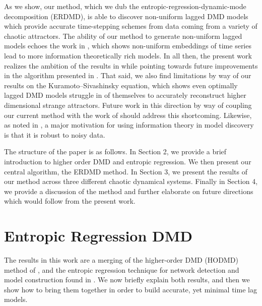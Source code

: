 \documentclass[a4paper,11pt]{article}
\begin{document}
As we show, our method, which we dub the entropic-regression-dynamic-mode decomposition (ERDMD), is able to discover non-uniform lagged DMD models which provide accurate time-stepping schemes from data coming from a variety of chaotic attractors.  The ability of our method to generate non-uniform lagged models echoes the work in \cite{vlachos, faes}, which shows non-uniform embeddings of time series lead to more information theoretically rich models.  In all then, the present work realizes the ambition of the results in \cite{arbabi} while pointing towards future improvements in the algorithm presented in \cite{curtis_dldmd}.  That said, we also find limitations by way of our results on the Kuramoto--Sivashinsky equation, which shows even optimally lagged DMD models struggle in of themselves to accurately reconstruct higher dimensional strange attractors.  Future work in this direction by way of coupling our current method with the work of \cite{curtis_dldmd} should address this shortcoming.  Likewise, as noted in \cite{bollt2}, a major motivation for using information theory in model discovery is that it is robust to noisy data.

The structure of the paper is as follows.  In Section 2, we provide a brief introduction to higher order DMD and entropic regression.  We then present our central algorithm, the ERDMD method.  In Section 3, we present the results of our method across three different chaotic dynamical systems.  Finally in Section 4, we provide a discussion of the method and further elaborate on future directions which would follow from the present work.   

\section{Entropic Regression DMD}

The results in this work are a merging of the higher-order DMD (HODMD) method of \cite{clainche}, and the entropic regression technique for network detection and model construction found in \cite{bollt, bollt2}.  We now briefly explain both results, and then we show how to bring them together in order to build accurate, yet minimal time lag models.     
\end{document}
